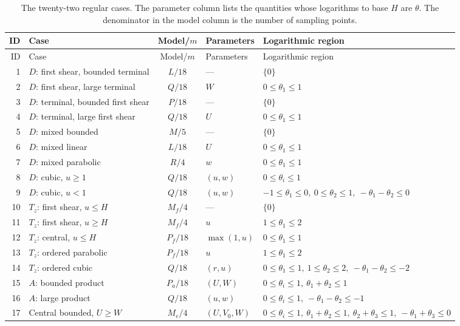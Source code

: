 \documentclass[11pt]{amsart}
\theoremstyle{definition}
\theoremstyle{remark}
\numberwithin{equation}{section}
\begin{document}
{\small
\begin{longtable}{r p{} c p{} p{}}
\caption{The twenty-two regular cases. The parameter column lists the quantities whose logarithms to base $H$ are $\theta$. The denominator in the model column is the number of sampling points.}\label{reg:all-regimes}\\
ID & Case & Model/$m$ & Parameters & Logarithmic region\\\hline
\endfirsthead
ID & Case & Model/$m$ & Parameters & Logarithmic region\\\hline
\endhead
1 & $D$: first shear, bounded terminal & $L/18$ & --- & $\{0\}$\\
2 & $D$: first shear, large terminal & $Q/18$ & $W$ & $0\le\theta_1\le1$\\
3 & $D$: terminal, bounded first shear & $P/18$ & --- & $\{0\}$\\
4 & $D$: terminal, large first shear & $Q/18$ & $U$ & $0\le\theta_1\le1$\\
5 & $D$: mixed bounded & $M/5$ & --- & $\{0\}$\\
6 & $D$: mixed linear & $L/18$ & $U$ & $0\le\theta_1\le1$\\
7 & $D$: mixed parabolic & $R/4$ & $w$ & $0\le\theta_1\le1$\\
8 & $D$: cubic, $u\ge1$ & $Q/18$ & $(u,w)$ & $0\le\theta_i\le1$\\
9 & $D$: cubic, $u<1$ & $Q/18$ & $(u,w)$ & $-1\le\theta_1\le 0,\ 0\le\theta_2\le 1,\ -\theta_1-\theta_2\le 0$\\
10 & $T_z$: first shear, $u\le H$ & $M_f/4$ & --- & $\{0\}$\\
11 & $T_z$: first shear, $u\ge H$ & $M_f/4$ & $u$ & $1\le\theta_1\le 2$\\
12 & $T_z$: central, $u\le H$ & $P_f/18$ & $\max(1,u)$ & $0\le\theta_1\le1$\\
13 & $T_z$: ordered parabolic & $P_f/18$ & $u$ & $1\le\theta_1\le 2$\\
14 & $T_z$: ordered cubic & $Q/18$ & $(r,u)$ & $0\le\theta_1\le 1,\ 1\le\theta_2\le 2,\ -\theta_1-\theta_2\le -2$\\
15 & $A$: bounded product & $P_a/18$ & $(U,W)$ & $0\le\theta_i\le1,\ \theta_1+\theta_2\le 1$\\
16 & $A$: large product & $Q/18$ & $(u,w)$ & $0\le\theta_i\le1,\ -\theta_1-\theta_2\le -1$\\
17 & Central bounded, $U\ge W$ & $M_e/4$ & $(U,V_0,W)$ & $0\le\theta_i\le1,\ \theta_1+\theta_2\le 1,\ \theta_2+\theta_3\le 1,\ -\theta_1+\theta_3\le 0$\\

\end{longtable}}
\end{document}
